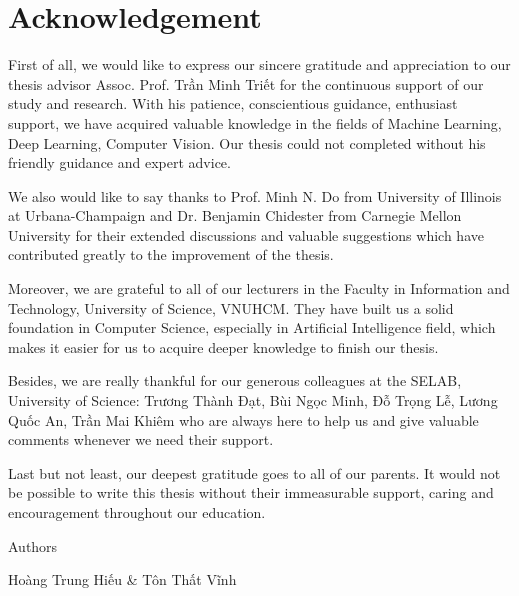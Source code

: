\chapter{Acknowledgement}

First of all, we would like to express our sincere gratitude and appreciation to our thesis advisor Assoc. Prof. Trần Minh Triết for the continuous support of our study and research. With his patience, conscientious guidance, enthusiast support, we have acquired valuable knowledge in the fields of Machine Learning, Deep Learning, Computer Vision. Our thesis could not completed without his friendly guidance and expert advice.

We also would like to say thanks to Prof. Minh N. Do from University of Illinois at Urbana-Champaign and Dr. Benjamin Chidester from Carnegie Mellon University for their extended discussions and valuable suggestions which have contributed greatly to the improvement of the thesis.

Moreover, we are grateful to all of our lecturers in the Faculty in Information and Technology, University of Science, VNUHCM. They have built us a solid foundation in Computer Science, especially in Artificial Intelligence field, which makes it easier for us to acquire deeper knowledge to finish our thesis.

Besides, we are really thankful for our generous colleagues at the SELAB, University of Science: Trương Thành Đạt, Bùi Ngọc Minh, Đỗ Trọng Lễ, Lương Quốc An, Trần Mai Khiêm who are always here to help us and give valuable comments whenever we need their support.   

Last but not least, our deepest gratitude goes to all of our parents. It would not be possible to write this thesis without their immeasurable support, caring and encouragement throughout our education. 

\begin{flushright}
\begin{minipage}{8cm}
\centering
Authors

Hoàng Trung Hiếu \& Tôn Thất Vĩnh 
\end{minipage}
\end{flushright}